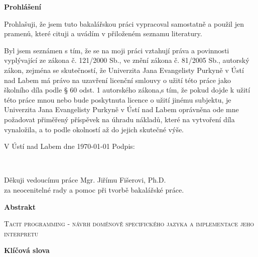 \documentclass[male,czech]{kithesis}
\newcommand{\TITULcz}{Tacit programming - návrh doménově specifického jazyka a implementace jeho interpretu} %
\begin{document}
\cleardoublepage
\thispagestyle{empty}

\textbf{Prohlášení}

Prohlašuji, že jsem tuto bakalářskou práci vypracoval samostatně a použil
jen pramenů, které cituji a uvádím v přiloženém seznamu literatury.

\vspace{1em}
Byl jsem seznámen s tím, že se na moji práci vztahují práva a povinnosti vyplývající ze zákona č. 121/2000 Sb., ve znění zákona č. 81/2005 Sb., autorský zákon, zejména se skutečností, že Univerzita Jana Evangelisty Purkyně v Ústí nad Labem má právo na uzavření licenční smlouvy o užití této práce jako školního díla podle § 60 odst. 1 autorského zákona,s tím, že pokud dojde k užití této práce mnou nebo bude poskytnuta licence o užití jinému
subjektu, je Univerzita Jana Evangelisty Purkyně v Ústí nad Labem oprávněna ode mne požadovat přiměřený příspěvek na úhradu nákladů, které na vytvoření díla vynaložila, a to podle okolností až do jejich skutečné výše.

\vspace{1em}
V Ústí nad Labem dne \today \hspace{0.3\textwidth} Podpis:


\clearpage
\thispagestyle{empty}
~\vfill

\begin{flushright}
  Děkuji vedoucímu práce Mgr. Jiřímu Fišerovi, Ph.D.\\ za neocenitelné rady a pomoc při tvorbě bakalářské práce.
\end{flushright}

\cleardoublepage
\thispagestyle{empty}

\textbf{\textsf{Abstrakt}}

\textsc{\TITULcz}


\textbf{\textsf{Klíčová slova}}


\vspace{1em}
\hrulefill
\vspace{1em}
\end{document}
